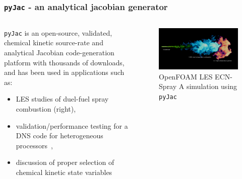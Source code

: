\documentclass{beamer}
\begin{document}
\begin{frame}
 \frametitle{\texttt{pyJac} - an analytical jacobian generator}
 \begin{columns}[c]
  \begin{column}{0.6\textwidth}
  \begin{minipage}[c]{\columnwidth}
    \texttt{pyJac} is an open-source, validated, chemical kinetic source-rate and analytical Jacobian code-generation platform with thousands of downloads, and has been used in applications such as:
    \begin{itemize}
     \item LES studies of duel-fuel spray combustion (right),
     \item validation\slash performance testing for a DNS code for heterogeneous processors~,
     \item discussion of proper selection of chemical kinetic state variables~
    \end{itemize}
    \vfill
  \end{minipage}
  \end{column}
  \begin{column}{0.4\textwidth}
    \begin{center}
     \begin{figure}
      \centering
      \includegraphics[width=\columnwidth]{spray.png}
      \caption{OpenFOAM LES ECN-Spray A simulation using \texttt{pyJac}}
     \end{figure}
    \end{center}
  \end{column}
 \end{columns}
\end{frame}
\end{document}
